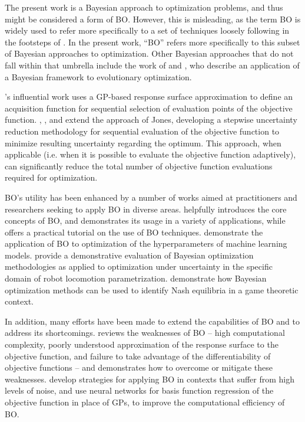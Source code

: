 \documentclass[10pt,a4paper]{article}
\begin{document}
The present work is a Bayesian approach to optimization problems, and thus might be considered a form of BO.
However, this is misleading, as the term BO is widely used to refer more specifically to a set of techniques loosely following in the footsteps of \citet{Jones1998}.
In the present work, ``BO'' refers more specifically to this subset of Bayesian approaches to optimization.
Other Bayesian approaches that do not fall within that umbrella include the work of \citet{Pelikan1999} and \citet{Pelikan2005}, who describe an application of a Bayesian framework to evolutionary optimization.

\citeauthor{Jones1998}'s \citeyearpar{Jones1998} influential work uses a GP-based response surface approximation to define an acquisition function for sequential selection of evaluation points of the objective function.
\citet{Vazquez2009}, \citet{Bect2012}, and \citet{Chevalier2014} extend the approach of Jones, developing a stepwise uncertainty reduction methodology for sequential evaluation of the objective function to minimize resulting uncertainty regarding the optimum.
This approach, when applicable (i.e. when it is possible to evaluate the objective function adaptively), can significantly reduce the total number of objective function evaluations required for optimization.

BO's utility has been enhanced by a number of works aimed at practitioners and researchers seeking to apply BO in diverse areas.
\citet{Shahriari2016} helpfully introduces the core concepts of BO, and demonstrates its usage in a variety of applications, while \citet{Frazier2018} offers a practical tutorial on the use of BO techniques.
\citet{Snoek2012} demonstrate the application of BO to optimization of the hyperparameters of machine learning models.
\citet{Calandra2016} provide a demonstrative evaluation of Bayesian optimization methodologies as applied to optimization under uncertainty in the specific domain of robot locomotion parametrization.
\citet{Picheny2019} demonstrate how Bayesian optimization methods can be used to identify Nash equilibria in a game theoretic context.

In addition, many efforts have been made to extend the capabilities of BO and to address its shortcomings.
\citet{Lizotte2008} reviews the weaknesses of BO -- high computational complexity, poorly understood approximation of the response surface to the objective function, and failure to take advantage of the differentiability of objective functions -- and demonstrates how to overcome or mitigate these weaknesses.
\citet{Letham2019} develop strategies for applying BO in contexts that suffer from high levels of noise, and \citet{Snoek2015} use neural networks for basis function regression of the objective function in place of GPs, to improve the computational efficiency of BO.
\end{document}
